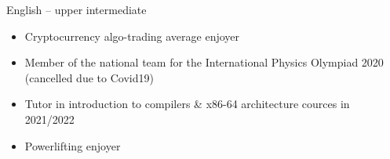     English -- upper intermediate
    \smallskip

    \begin{itemize}
        \item Cryptocurrency algo-trading average enjoyer
        \item Member of the national team for the International Physics Olympiad 2020 (cancelled due to Covid19)
        \item Tutor in introduction to compilers \& x86-64 architecture cources in 2021/2022
        \item Powerlifting enjoyer
    \end{itemize}

